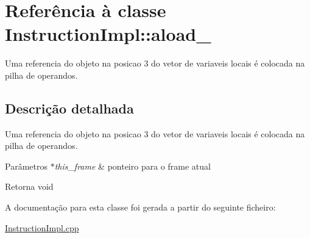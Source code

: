 \hypertarget{class_instruction_impl_1_1aload__3}{}\section{Referência à classe Instruction\+Impl\+:\+:aload\+\_}
\label{class_instruction_impl_1_1aload__3}


Uma referencia do objeto na posicao 3 do vetor de variaveis locais é colocada na pilha de operandos.  




\subsection{Descrição detalhada}
Uma referencia do objeto na posicao 3 do vetor de variaveis locais é colocada na pilha de operandos. 


\begin{DoxyParams}{Parâmetros}
{\em $\ast$this\+\_\+frame} & ponteiro para o frame atual \\
\hline
\end{DoxyParams}
\begin{DoxyReturn}{Retorna}
void 
\end{DoxyReturn}


A documentação para esta classe foi gerada a partir do seguinte ficheiro\+:\begin{DoxyCompactItemize}
\item 
\hyperlink{_instruction_impl_8cpp}{Instruction\+Impl.\+cpp}\end{DoxyCompactItemize}
